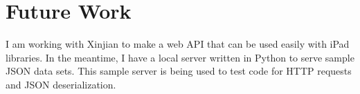 \section{Future Work}

I am working with Xinjian to make a web API that can be used easily with iPad libraries. In the meantime, I have a local server written in Python to serve sample JSON data sets. This sample server is being used to test code for HTTP requests and JSON deserialization.
